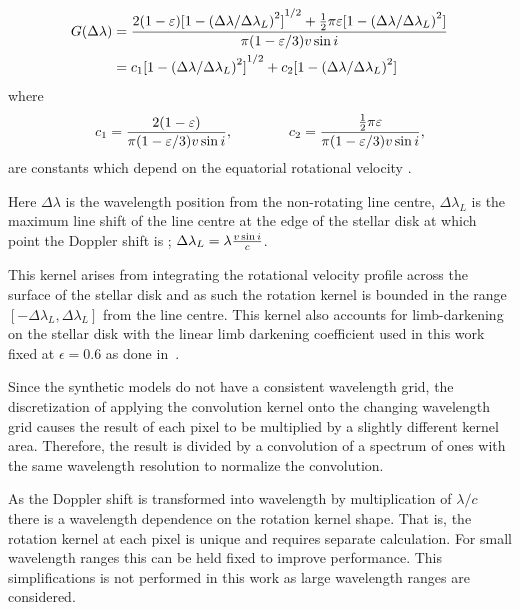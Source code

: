 
\begin{align}
G(\Delta\lambda) &= \frac{2(1-\varepsilon){[1-{(\Delta\lambda /{\Delta\lambda}_{L})}^{2}]}^{1/2} +   \frac{1}{2}\pi\varepsilon[1-{(\Delta\lambda /{\Delta\lambda}_{L})}^{2}]}{\pi (1-\varepsilon/3) v\sin{i}}\\
&= c_{1}{[1- {(\Delta\lambda /\Delta\lambda_{L})}^{2}]}^{1/2} + c_{2}[1-{(\Delta\lambda /\Delta\lambda_{L})}^{2}] \label{eqn:rotational_profile}
\end{align}
where
\begin{equation}
{c}_{1} = \frac{2(1-\varepsilon)} {\pi (1-\varepsilon/3)v\sin{i}},  \hspace{4em} {c}_{2} = \frac{\frac{1}{2}\pi\varepsilon} {\pi (1-\varepsilon/3)v\sin{i}},
\end{equation}
are constants which depend on the equatorial rotational velocity \Vsini{}.

Here $\Delta\lambda$ is the wavelength position from the non-rotating line centre, $\Delta\lambda_{L}$ is the maximum line shift of the line centre at the edge of the stellar disk at which point the Doppler shift is  \Vsini{}; $\Delta\lambda_{L} = \lambda \frac{v\sin{i}}{c}$.

This kernel arises from integrating the rotational velocity profile across the surface of the stellar disk and as such the rotation kernel is bounded in the range  $[-\Delta\lambda_L, \Delta\lambda_{L}]$ from the line centre.
This kernel also accounts for limb-darkening on the stellar disk with the linear limb darkening coefficient used in this work fixed at $\epsilon=0.6$ as done in~\citet{figueira_radial_2016}.

Since the synthetic models do not have a consistent wavelength grid, the discretization of applying the convolution kernel onto the changing wavelength grid causes the result of each pixel to be multiplied by a slightly different kernel area.
Therefore, the result is divided by a convolution of a spectrum of ones with the same wavelength resolution to normalize the convolution.

As the Doppler shift \Vsini{} is transformed into wavelength by multiplication of $\lambda  / c$ there is a wavelength dependence on the rotation kernel shape.
That is, the rotation kernel at each pixel is unique and requires separate calculation.
For small wavelength ranges this can be held fixed to improve performance.
This simplifications is not performed in this work as large wavelength ranges are considered.


